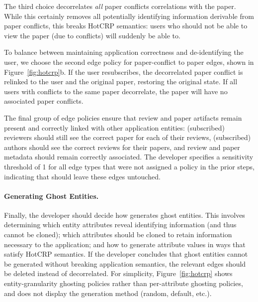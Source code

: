The third choice decorrelates \emph{all} paper conflicts correlations with the paper. While this
certainly removes all potentially identifying information derivable from paper conflicts, this
breaks HotCRP semantics: users who should not be able to view the paper (due to conflicts) will
suddenly be able to.

To balance between maintaining application correctness and de-identifying the user, we choose the
second edge policy for paper-conflict to paper edges, shown in Figure~\ref{fig:hotcrp}b.
If the user resubscribes, the decorrelated paper conflict is relinked to the user and the original
paper, restoring the original state.  If all users with conflicts to the same paper decorrelate, the
paper will have no associated paper conflicts.


The final group of edge policies ensure that review and paper artifacts remain present
and correctly linked with other application entities: (subscribed) reviewers should still see the
correct paper for each of their reviews, (subscribed) authors should see the correct reviews for
their papers, and review and paper metadata should remain correctly associated. The developer
specifies a sensitivity threshold of 1 for all edge types that were not assigned a policy in the
prior steps, indicating that \sys should leave these edges untouched.

\paragraph{Generating Ghost Entities.}
Finally, the developer should decide how \sys generates ghost entities. This involves determining
which entity attributes reveal identifying information (and thus cannot be cloned); which attributes
should be cloned to retain information necessary to the application; and how to generate attribute
values in ways that satisfy HotCRP semantics.
If the developer concludes that ghost entities cannot be generated without breaking application
semantics, the relevant edges should be deleted instead of decorrelated.
For simplicity, Figure~\ref{fig:hotcrp} shows entity-granularity ghosting policies
rather than per-attribute ghosting policies, and does not display the generation method (\eg random, default, etc.).


